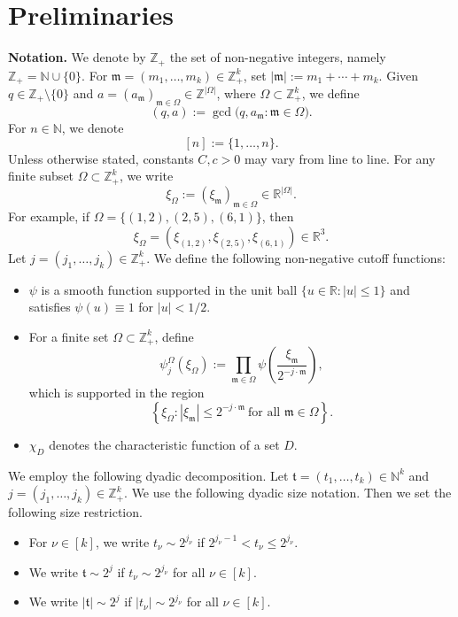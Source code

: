 \documentclass[10pt,a4paper]{amsart}
\numberwithin{equation}{section}
\begin{document}
  \section{Preliminaries}\label{sec2}
  \noindent
{\bf Notation.} 
We denote by $\mathbb{Z}_+$ the set of non-negative integers, namely
$\mathbb{Z}_+ = \mathbb{N} \cup \{0\}.$
For $\mathfrak{m}=(m_1,\ldots,m_k)\in\mathbb{Z}_+^k$, set $ |\mathfrak{m}|:=m_1+\cdots+m_k.$ Given $q \in \mathbb{Z}_+ \setminus \{0\}$ and
$a = (a_{\mathfrak m})_{\mathfrak m \in \Omega} \in \mathbb{Z}^{|\Omega|}$,
where $\Omega \subset \mathbb{Z}_+^{k}$, we define
\[
(q,a) := \gcd\bigl(q, a_{\mathfrak m} : \mathfrak m \in \Omega\bigr).
\]
For $n \in \mathbb{N}$, we denote $$[n] := \{1,\dots,n\}.$$
Unless otherwise stated, constants $C,c>0$ may vary from line to line.
For any finite subset $\Omega \subset \mathbb{Z}_+^{k}$,
we write
\begin{equation*}
\xi_{\Omega} := (\xi_{\mathfrak m})_{\mathfrak m \in \Omega}
\in \mathbb{R}^{|\Omega|}.
\end{equation*}
For example, if $\Omega = \{(1,2),(2,5),(6,1)\}$, then
\[
\xi_{\Omega}
= (\xi_{(1,2)}, \xi_{(2,5)}, \xi_{(6,1)}) \in \mathbb{R}^{3}.
\]
 Let $j = (j_1,\dots,j_k) \in \mathbb{Z}_+^{k}$.
We  define the following non-negative cutoff functions:
\begin{itemize}
\item[(1)] $\psi$ is a smooth function supported in the unit ball
$\{u \in \mathbb{R} : |u| \le 1\}$ and satisfies
$\psi(u) \equiv 1$ for $|u| < 1/2$.
\item[(2)] For a finite set $\Omega \subset \mathbb{Z}_+^{k}$, define
\[
\psi^{\Omega}_{j}(\xi_\Omega)
:= \prod_{\mathfrak m \in \Omega}
\psi\!\left( \frac{\xi_{\mathfrak m}}{2^{-j \cdot \mathfrak m}} \right),
\]
which is supported in the region
\[
\left\{
\xi_{\Omega} : |\xi_{\mathfrak m}| \le 2^{-j \cdot \mathfrak m}
\ \text{for all } \mathfrak m \in \Omega
\right\}.
\]
\item[(3)] $\chi_D$ denotes the characteristic function of a set
$D$.
\end{itemize}
We employ the following dyadic decomposition.
Let $\mathfrak{t}=(t_1,\ldots,t_k)\in\mathbb {N}^k$ and
$j=(j_1,\ldots,j_k)\in\mathbb Z_+^k$.
We use the following dyadic size notation. Then we set the following size restriction.
\begin{itemize}
\item For $\nu \in [k]$, we write $t_\nu \sim 2^{j_\nu}$ if
$2^{j_\nu-1} < t_\nu \le 2^{j_\nu}$.
\item We write $\mathfrak t \sim 2^{j}$ if
$t_\nu \sim 2^{j_\nu}$ for all $\nu \in [k]$.
\item We write $|\mathfrak t| \sim 2^{j}$ if
$|t_\nu| \sim 2^{j_\nu}$ for all $\nu \in [k]$.
\end{itemize}
\end{document}
